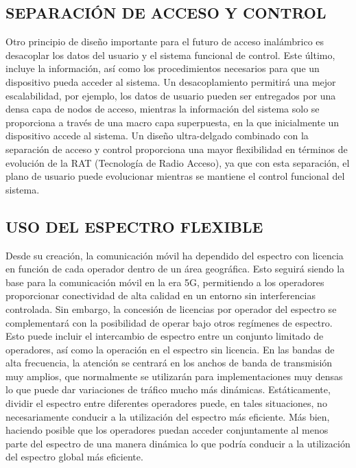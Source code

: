 \documentclass[]{article}
\begin{document}
\subsection{SEPARACIÓN DE ACCESO Y CONTROL}
Otro principio de diseño importante para el futuro de acceso inalámbrico es desacoplar
los datos del usuario y el sistema funcional de control. Este último, incluye la información,
así como los procedimientos necesarios para que un dispositivo pueda acceder al
sistema. Un desacoplamiento permitirá una mejor escalabilidad, por ejemplo, los datos de
usuario pueden ser entregados por una densa capa de nodos de acceso, mientras la
información del sistema solo se proporciona a través de una macro capa superpuesta, en
la que inicialmente un dispositivo accede al sistema. Un diseño ultra-delgado combinado
con la separación de acceso y control proporciona una mayor flexibilidad en términos de
evolución de la RAT (Tecnología de Radio Acceso), ya que con esta separación, el plano
de usuario puede evolucionar mientras se mantiene el control funcional del sistema.\\

\subsection{USO DEL ESPECTRO FLEXIBLE}
Desde su creación, la comunicación móvil ha dependido del espectro con licencia en
función de cada operador dentro de un área geográfica. Esto seguirá siendo la base para
la comunicación móvil en la era 5G, permitiendo a los operadores proporcionar
conectividad de alta calidad en un entorno sin interferencias controlada. Sin embargo, la
concesión de licencias por operador del espectro se complementará con la posibilidad de
operar bajo otros regímenes de espectro.
Esto puede incluir el intercambio de espectro entre un conjunto limitado de
operadores, así como la operación en el espectro sin licencia. En las bandas de alta
frecuencia, la atención se centrará en los anchos de banda de transmisión muy amplios,
que normalmente se utilizarán para implementaciones muy densas lo que puede dar
variaciones de tráfico mucho más dinámicas. Estáticamente, dividir el espectro entre
diferentes operadores puede, en tales situaciones, no necesariamente conducir a la
utilización del espectro más eficiente. Más bien, haciendo posible que los operadores
puedan acceder conjuntamente al menos parte del espectro de una manera dinámica lo
que podría conducir a la utilización del espectro global más eficiente.\\
\end{document}
